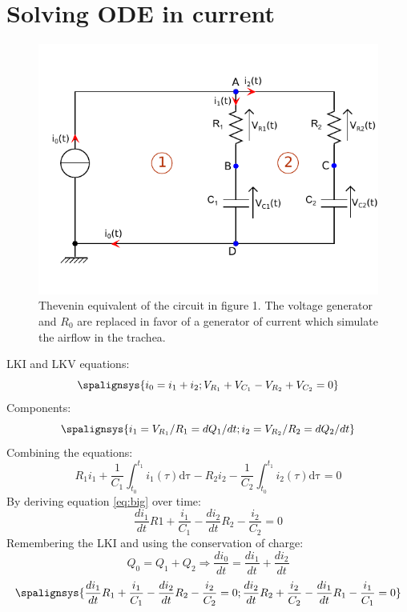 \documentclass[11pt]{article}
\begin{document}
\section{Solving ODE in current}
\begin{figure}[!th]
\includegraphics[scale=1.3]{TheveninEquivalent.pdf}
\caption{Thevenin equivalent of the circuit in figure 1. The voltage generator and $R_0$ are replaced in favor of a generator of current which simulate the airflow in the trachea.}
\end{figure}
LKI and LKV equations:
\begin{equation}
\label{eq:LKIandLKV}
  \spalignsys{
  	i_0 = i_1 + i_2;
  	V_{R_1} + V_{C_1} - V_{R_2} + V_{C_2} = 0
  }
\end{equation}
Components:
\begin{equation}
\label{eq:components}
  \spalignsys{
	i_1 = V_{R_1}/R_1 = dQ_1/dt;
	i_2 = V_{R_2}/R_2 = dQ_2/dt
  }
\end{equation}
Combining the equations:
\begin{equation}
\label{eq:big}
R_1i_1 + \frac{1}{C_1}\int_{t_0}^{t_1}i_1(\tau)\mathrm{d\tau} - R_2i_2 - \frac{1}{C_2}\int_{t_0}^{t_1}i_2(\tau)\mathrm{d\tau} = 0
\end{equation}
By deriving equation \eqref{eq:big} over time:
\[
\frac{di_1}{dt}R1 + \frac{i_1}{C_1} - \frac{di_2}{dt}R_2 - \frac{i_2}{C_2} = 0
\]
Remembering the LKI and using the conservation of charge: 
$$Q_0 = Q_1 + Q_2 \Rightarrow \frac{di_0}{dt} = \frac{di_1}{dt} + \frac{di_2}{dt}$$
\[
\spalignsys{
\frac{di_1}{dt}R_1 + \frac{i_1}{C_1} - \frac{di_2}{dt}R_2 - \frac{i_2}{C_2} = 0;
\frac{di_2}{dt}R_2 + \frac{i_2}{C_2} - \frac{di_1}{dt}R_1 - \frac{i_1}{C_1} = 0
}
\]
\end{document}
